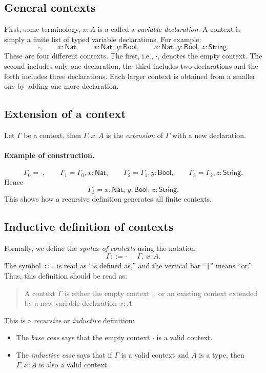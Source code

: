 \documentclass{article}
\newcommand{\Nat}{\mathsf{Nat}}
\newcommand{\Bool}{\mathsf{Bool}}
\newcommand{\String}{\mathsf{String}}
\newcommand{\emptyctx}{\cdot}              %
\begin{document}
\subsection*{General contexts}

First, some terminology, \(x : A\) is a called a \emph{variable declaration}.
A context is simply a finite list of typed variable declarations.  
For example:
\[
\emptyctx, \qquad
x : \Nat, \qquad
x : \Nat,\, y : \Bool, \qquad
x : \Nat,\, y : \Bool,\, z : \String.
\]
These are four different contexts. The first, i.e., $\cdot$, denotes the empty context. The second includes only one declaration, the third includes two declarations and the forth includes three declarations. Each larger context is obtained from a smaller one by adding one more declaration.

\subsection*{Extension of a context}
Let $\Gamma$ be a context, then \(\Gamma, x : A\) is the \emph{extension} of \(\Gamma\) with a new declaration.

\paragraph{Example of construction.}
\[
\Gamma_0 = \emptyctx, \qquad
\Gamma_1 = \Gamma_0, x : \Nat, \qquad
\Gamma_2 = \Gamma_1, y : \Bool, \qquad
\Gamma_3 = \Gamma_2, z : \String.
\]
Hence
\[
\Gamma_3 = x : \Nat,\, y : \Bool,\, z : \String.
\]
This shows how a recursive definition generates all finite contexts.

\subsection*{Inductive definition of contexts}

Formally, we define the \emph{syntax of contexts} using the notation
\[
\Gamma ::= \emptyctx \;\mid\; \Gamma,\, x : A.
\]
The symbol \texttt{::=} is read as “is defined as,” and the vertical bar “\texttt{|}” means “or.”  
Thus, this definition should be read as:

\begin{quote}
A context \(\Gamma\) is either the empty context \(\emptyctx\),  
or an existing context extended by a new variable declaration \(x : A\).
\end{quote}

This is a \emph{recursive} or \emph{inductive} definition:  
\begin{itemize}
  \item The \emph{base case} says that the empty context \(\emptyctx\) is a valid context.
  \item The \emph{inductive case} says that if \(\Gamma\) is a valid context and \(A\) is a type, then \(\Gamma, x : A\) is also a valid context.
\end{itemize}
\end{document}
